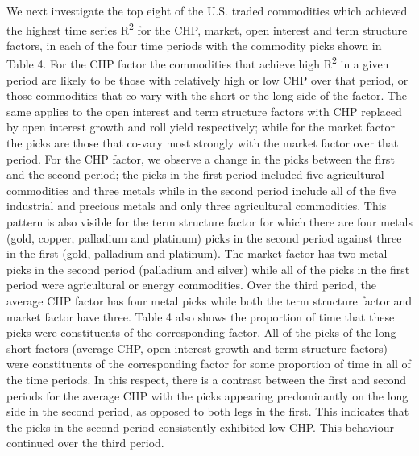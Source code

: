 \documentclass[11pt, letterpaper, doublespacing]{article}
\begin{document}
We next investigate the top eight of the U.S. traded commodities which
achieved the highest time series R\textsuperscript{2} for the CHP,
market, open interest and term structure factors, in each of the four
time periods with the commodity picks shown in Table 4. For the CHP
factor the commodities that achieve high R\textsuperscript{2} in a given
period are likely to be those with relatively high or low CHP over that
period, or those commodities that co-vary with the short or the long
side of the factor. The same applies to the open interest and term
structure factors with CHP replaced by open interest growth and roll
yield respectively; while for the market factor the picks are those that
co-vary most strongly with the market factor over that period. For the
CHP factor, we observe a change in the picks between the first and the
second period; the picks in the first period included five agricultural
commodities and three metals while in the second period include all of
the five industrial and precious metals and only three agricultural
commodities. This pattern is also visible for the term structure factor
for which there are four metals (gold, copper, palladium and platinum)
picks in the second period against three in the first (gold, palladium
and platinum). The market factor has two metal picks in the second
period (palladium and silver) while all of the picks in the first period
were agricultural or energy commodities. Over the third period, the
average CHP factor has four metal picks while both the term structure
factor and market factor have three. Table 4 also shows the proportion
of time that these picks were constituents of the corresponding factor.
All of the picks of the long-short factors (average CHP, open interest
growth and term structure factors) were constituents of the
corresponding factor for some proportion of time in all of the time
periods. In this respect, there is a contrast between the first and
second periods for the average CHP with the picks appearing
predominantly on the long side in the second period, as opposed to both
legs in the first. This indicates that the picks in the second period
consistently exhibited low CHP. This behaviour continued over the third
period.
\end{document}
